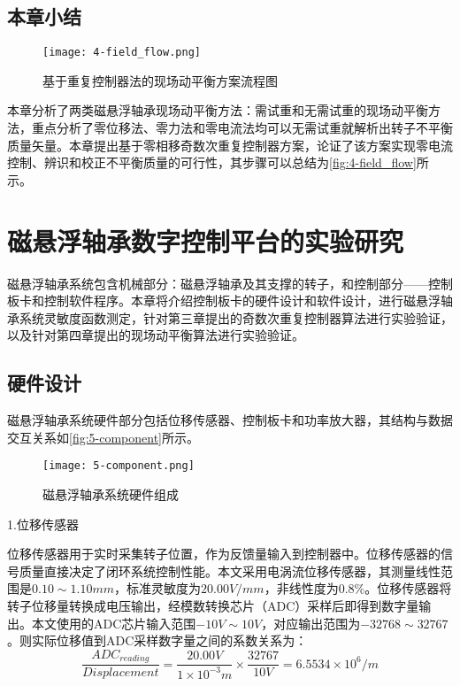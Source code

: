 \documentclass[
  lang=cn,
  degree=master,
  openany,oneside
]{nuaathesis}
\begin{document}
\section{本章小结}
\begin{figure}[h!]
	\texttt{[image: 4-field\_flow.png]}
	\caption{基于重复控制器法的现场动平衡方案流程图}
	\label{fig:4-field_flow}
\end{figure}

本章分析了两类磁悬浮轴承现场动平衡方法：需试重和无需试重的现场动平衡方法，重点分析了零位移法、零力法和零电流法均可以无需试重就解析出转子不平衡质量矢量。本章提出基于零相移奇数次重复控制器方案，论证了该方案实现零电流控制、辨识和校正不平衡质量的可行性，其步骤可以总结为\autoref{fig:4-field_flow}所示。




\chapter{磁悬浮轴承数字控制平台的实验研究}
磁悬浮轴承系统包含机械部分：磁悬浮轴承及其支撑的转子，和控制部分——控制板卡和控制软件程序。本章将介绍控制板卡的硬件设计和软件设计，进行磁悬浮轴承系统灵敏度函数测定，针对第三章提出的奇数次重复控制器算法进行实验验证，以及针对第四章提出的现场动平衡算法进行实验验证。

\section{硬件设计}
磁悬浮轴承系统硬件部分包括位移传感器、控制板卡和功率放大器，其结构与数据交互关系如\autoref{fig:5-component}所示。

\begin{figure}[h!]
	\texttt{[image: 5-component.png]}
	\caption{磁悬浮轴承系统硬件组成}
	\label{fig:5-component}
\end{figure}

1.位移传感器

位移传感器用于实时采集转子位置，作为反馈量输入到控制器中。位移传感器的信号质量直接决定了闭环系统控制性能。本文采用电涡流位移传感器，其测量线性范围是$0.10 \sim 1.10mm$，标准灵敏度为$20.00V/mm$，非线性度为$0.8\%$。位移传感器将转子位移量转换成电压输出，经模数转换芯片（ADC）采样后即得到数字量输出。本文使用的ADC芯片输入范围$-10V \sim 10V$，对应输出范围为$-32768 \sim 32767$。则实际位移值到ADC采样数字量之间的系数关系为：
\begin{equation}
\frac{ADC_{reading}}{Displacement} = \frac{20.00V}{1 \times 10^{-3}m} \times \frac{32767}{10V} = 6.5534 \times 10^6/m
\end{equation}
\end{document}
